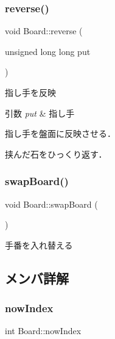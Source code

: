 \subsubsection{\texorpdfstring{reverse()}{reverse()}}
{\footnotesize\ttfamily void Board\+::reverse (\begin{DoxyParamCaption}\item[{unsigned long long}]{put }\end{DoxyParamCaption})\hspace{0.3cm}{\ttfamily [inline]}}



指し手を反映 


\begin{DoxyParams}{引数}
{\em put} & 指し手\\
\hline
\end{DoxyParams}
指し手を盤面に反映させる．

挟んだ石をひっくり返す． \mbox{\label{class_board_ab9840889c8175263c935c45ab4ea8aad}} 
\subsubsection{\texorpdfstring{swap\+Board()}{swapBoard()}}
{\footnotesize\ttfamily void Board\+::swap\+Board (\begin{DoxyParamCaption}{ }\end{DoxyParamCaption})\hspace{0.3cm}{\ttfamily [inline]}}



手番を入れ替える 



\subsection{メンバ詳解}
\mbox{\label{class_board_a828fcce6e6515fde763ae6b05474f2d9}} 
\subsubsection{\texorpdfstring{now\+Index}{nowIndex}}
{\footnotesize\ttfamily int Board\+::now\+Index}

\mbox{\label{class_board_afaab59020384a4975249c9b240c65b14}} 
